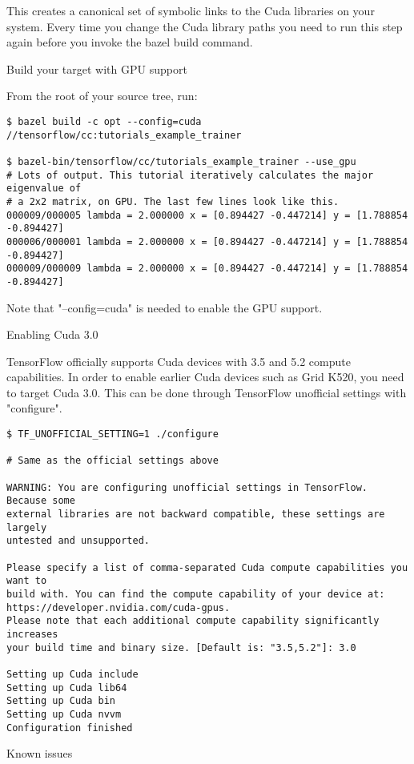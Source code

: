 This creates a canonical set of symbolic links to the Cuda libraries on your system. Every time you change the Cuda library paths you need to run this step again before you invoke the bazel build command.

Build your target with GPU support

From the root of your source tree, run:

\begin{lstlisting}
$ bazel build -c opt --config=cuda //tensorflow/cc:tutorials_example_trainer

$ bazel-bin/tensorflow/cc/tutorials_example_trainer --use_gpu
# Lots of output. This tutorial iteratively calculates the major eigenvalue of
# a 2x2 matrix, on GPU. The last few lines look like this.
000009/000005 lambda = 2.000000 x = [0.894427 -0.447214] y = [1.788854 -0.894427]
000006/000001 lambda = 2.000000 x = [0.894427 -0.447214] y = [1.788854 -0.894427]
000009/000009 lambda = 2.000000 x = [0.894427 -0.447214] y = [1.788854 -0.894427]
\end{lstlisting}

Note that "--config=cuda" is needed to enable the GPU support.

Enabling Cuda 3.0

TensorFlow officially supports Cuda devices with 3.5 and 5.2 compute capabilities. In order to enable earlier Cuda devices such as Grid K520, you need to target Cuda 3.0. This can be done through TensorFlow unofficial settings with "configure".

\begin{lstlisting}
$ TF_UNOFFICIAL_SETTING=1 ./configure

# Same as the official settings above

WARNING: You are configuring unofficial settings in TensorFlow. Because some
external libraries are not backward compatible, these settings are largely
untested and unsupported.

Please specify a list of comma-separated Cuda compute capabilities you want to
build with. You can find the compute capability of your device at:
https://developer.nvidia.com/cuda-gpus.
Please note that each additional compute capability significantly increases
your build time and binary size. [Default is: "3.5,5.2"]: 3.0

Setting up Cuda include
Setting up Cuda lib64
Setting up Cuda bin
Setting up Cuda nvvm
Configuration finished
\end{lstlisting}

Known issues

